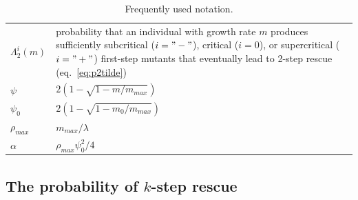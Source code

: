 \documentclass[9pt,twocolumn,twoside,lineno]{gsajnl}
\begin{document}
\begin{table}[!h]
\begin{tabular}{p{1.5cm} p{6.5cm}}
$\Lambda_2^{i}(m)$ & probability that an individual with growth rate $m$ produces sufficiently subcritical ($i="-"$), critical ($i=0$), or supercritical ($i="+"$) first-step mutants that eventually lead to 2-step rescue (eq.\ \ref{eq:p2tilde}) \\
$\psi$ & $2(1-\sqrt{1-m/m_{max}})$ \\
$\psi_0$ & $2(1-\sqrt{1-m_0/m_{max}})$\\
$\rho_{max}$ & $m_{max}/\lambda$\\
$\alpha$ & $\rho_{max} \psi_0^2/4$\\
\hline
\end{tabular}
\caption{Frequently used notation.}
\label{tab:notation}   
\end{table}

\subsection{The probability of $k$-step rescue}
\end{document}
